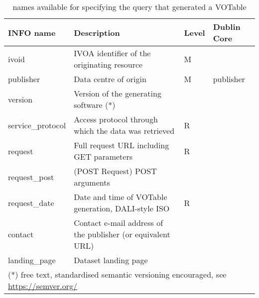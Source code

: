 \documentclass[11pt,a4paper]{ivoa}
\begin{document}
\begin{table}
\raggedright
\begin{tabular}{|l|p{7cm}|l|l|}  \hline
\textbf{INFO name} & \textbf{Description} & \textbf{Level} & \textbf{Dublin Core}\\ \hline
ivoid             & IVOA identifier of the originating resource & M &  \\ \hline
publisher         & Data centre of origin & M & publisher\\ \hline
version           & Version of the generating software (*) & & \\ \hline
service\_protocol & Access protocol through which the data was retrieved & R& \\ \hline
request           & Full request URL including GET parameters &  R& \\ \hline
request\_post     & (POST Request) POST arguments &  & \\ \hline
request\_date     & Date and time of VOTable generation, DALI-style ISO & R&\\ \hline	
contact           & Contact e-mail address of the publisher (or equivalent URL) & & \\ \hline	
landing\_page     & Dataset landing page & & \\ \hline
\multicolumn{4}{l}{\footnotesize(*) free text, standardised semantic versioning encouraged, see \url{https://semver.org/}} \\
\end{tabular}
\caption{ names available for specifying the query that
generated a VOTable}
\label{tab:query-names}
\end{table}
\end{document}
